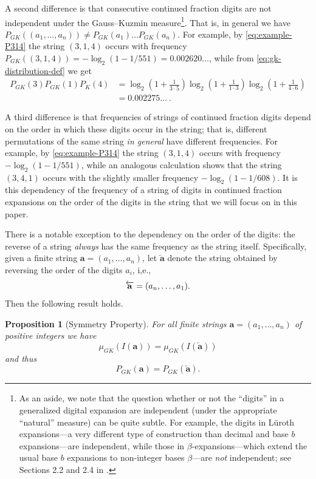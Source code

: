 \documentclass[10pt]{article}
\newtheorem{proposition}[lemma]{Proposition}
\theoremstyle{definition}
\newtheorem*{SymmetryProperty}{Symmetry Property}
\numberwithin{equation}{section}
\numberwithin{lemma}{section}
\newcommand{\bfa}{\mathbf{a}}
\newcommand{\bfar}{\overleftarrow{\bfa}}
\begin{document}
A second difference is that
consecutive continued fraction digits are not independent under the
Gauss--Kuzmin measure\footnote{%
As an aside, we note that the question whether or not the ``digits''
in a generalized digital expansion are independent (under the 
appropriate ``natural'' measure) can be quite subtle. For example, the digits  
in L\"uroth expansions---a very different type of
construction than decimal and base $b$ expansions---are independent, 
while those in 
$\beta$-expansions---which extend the usual base $b$ expansions 
to non-integer bases $\beta$---are \emph{not} independent; see
Sections 2.2 and 2.4 in \cite{dajani-kraaikamp-book}.}.
That is, in
general we have
$P_{GK}((a_1,\allowbreak \dots,a_n))\allowbreak
\not=P_{GK}(a_1)\dots P_{GK}(a_n)$.  For example, 
by \eqref{eq:example-P314} the string 
$(3,1,4)$ occurs with frequency
$P_{GK}((3,1,4))=-\log_2(1-1/551)=0.002620\dots$, while
from \eqref{eq:gk-distribution-def} we get
\begin{align*}
P_{GK}(3)P_{GK}(1)P_{K}(4)
&=
\log_2 \left(1+\frac1{3\cdot 5}\right)
\log_2 \left(1+\frac1{1\cdot 3}\right)
\log_2 \left(1+\frac1{4\cdot 6}\right)
\\
&=0.002275\dots\ .
\end{align*}

A third difference is that frequencies of strings of continued fraction
digits depend on the order in which these digits occur in the string;
that is, different permutations of the same string \emph{in general}
have different frequencies.  For example, by \eqref{eq:example-P314} the
string $(3,1,4)$ occurs with frequency $-\log_2(1-1/551)$, while an
analogous calculation shows that the string $(3,4,1)$ occurs with the
slightly smaller frequency $-\log_2(1-1/608)$.  It is this dependency of
the frequency of a string of digits in continued fraction expansions on
the order of the digits in the string that we will focus on in 
this paper. 

There is a notable
exception to the dependency on the order of the digits: 
the reverse of a string \emph{always} has the same
frequency as the string itself. 
Specifically, given 
a finite string $\bfa=(a_1,\dots,a_n)$, let $\bfar$ denote the string
obtained by reversing the order of the digits $a_i$, i,e., 
\begin{equation}
\notag
\bfar=(a_n,\dots,a_1).
\end{equation}
Then the following result holds.

\begin{proposition}[Symmetry Property]
\label{lem:symmetry-property}
For all finite strings $\bfa=(a_1,\dots,a_n)$ of positive integers we have
\begin{equation}
\label{eq:symmetry}
\mu_{GK}(I(\bfa))=\mu_{GK}(I(\bfar))
\end{equation}
and thus
\begin{equation}
\label{eq:symmetry-alt}
P_{GK}(\bfa)=P_{GK}(\bfar).
\end{equation}
\end{proposition}
\end{document}

